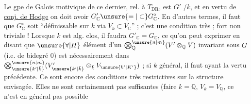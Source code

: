Le gpe de Galois motivique de ce dernier, rel. à $T_{\mathrm{DR}}$, est    $G'$ /$k$,  et en vertu de \uline{conj. de Hodge} on doit avoir $G'_{\mathbb C}\unsure{=|\subset}G^\circ_{\mathbb C}$.  En d'autres termes, il faut que $G^\circ_{\mathbb C}$ soit ``définissable sur $k$ via $V_k\subset V_{\mathbb C}$'' ; c'est une condition très ; fort non triviale ! Lorsque $k$ est alg. clos, il faudra  $G'_{\mathbb C}=G_{\mathbb C}$, ce qu'on peut exprimer en disant que $\unsure{\forall|H}$  élément d'un ${\bigotimes}_{\mathbb Q}^{\unsure{n|m}}(V'\otimes_{\mathbb Q}V)$ invariant sous $G$ (i.e. de bidegré $0$) est nécessairement dans $\bigotimes_{\unsure{k'|\bar k}}^{\unsure{n|m}}(V'_{\unsure{k'|\bar k}}\otimes_{\bar k}V_{\unsure{k'|K'}})$\unsure{!} ; si $k$ général, il faut   ayant la vertu précédente. Ce sont encore des conditions très restrictives sur la structure envisagée. Elles ne sont certainement pas suffisantes (faire $k=\mathbb Q$, $V_k=V_{\mathbb Q}$, ce n'est en général pas possible
{\centering \textsc{}\\
\textit{ }\par}
